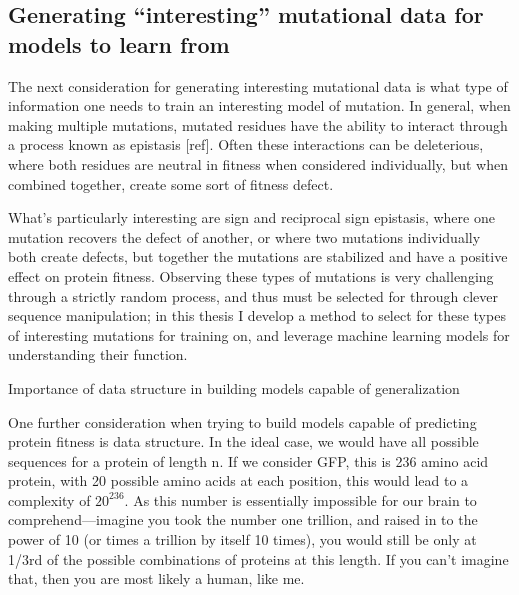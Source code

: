 \subsection{Generating “interesting” mutational data for models to learn from}

The next consideration for generating interesting mutational data is what type of information one needs to train an interesting model of mutation. In general, when making multiple mutations, mutated residues have the ability to interact through a process known as epistasis [ref]. Often these interactions can be deleterious, where both residues are neutral in fitness when considered individually, but when combined together, create some sort of fitness defect.

What’s particularly interesting are sign and reciprocal sign epistasis, where one mutation recovers the defect of another, or where two mutations individually both create defects, but together the mutations are stabilized and have a positive effect on protein fitness\cite{Poelwijk2016-sj}. Observing these types of mutations is very challenging through a strictly random process, and thus must be selected for through clever sequence manipulation; in this thesis I develop a method to select for these types of interesting mutations for training on, and leverage machine learning models for understanding their function. 

Importance of data structure in building models capable of generalization 

One further consideration when trying to build models capable of predicting protein fitness is data structure. In the ideal case, we would have all possible sequences for a protein of length n. If we consider GFP, this is 236 amino acid protein, with 20 possible amino acids at each position, this would lead to a complexity of \( 20^{236}\). As this number is essentially impossible for our brain to comprehend---imagine you took the number one trillion, and raised in to the power of 10 (or times a trillion by itself 10 times), you would still be only at 1/3rd of the possible combinations of proteins at this length. If you can’t imagine that, then you are most likely a human, like me. 

